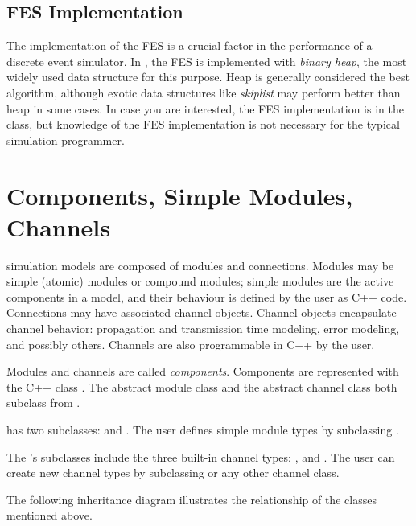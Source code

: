 \subsection{FES Implementation}
\label{sec:simple-modules:fes-implementation}

The implementation of the FES is a crucial factor in the
performance of a discrete event simulator. In {\opp}, the FES is
implemented with \textit{binary heap}, the most
widely used data structure for this purpose. Heap is generally considered the best
algorithm, although exotic data structures like
\textit{skiplist} may perform better than heap in some
cases. In case you are interested, the FES implementation is in the
 class, but knowledge of the FES implementation is
not necessary for the typical simulation programmer.


\section{Components, Simple Modules, Channels}
\label{sec:simple-modules-in-opp}

{\opp} simulation models are composed of modules and connections. Modules
may be simple (atomic) modules or compound modules; simple modules are the
active components in a model, and their behaviour is defined by the user as
C++ code. Connections may have associated channel objects. Channel objects
encapsulate channel behavior: propagation and transmission time modeling,
error modeling, and possibly others. Channels are also programmable in C++
by the user.

Modules and channels are called \textit{components}. Components are
represented with the C++ class . The abstract module
class  and the abstract channel class 
both subclass from .

 has two subclasses:  and
. The user defines simple module types by
subclassing .

The 's subclasses include the three built-in channel
types: ,  and
. The user can create new channel types
by subclassing  or any other channel class.

The following inheritance diagram illustrates the relationship
of the classes mentioned above.

